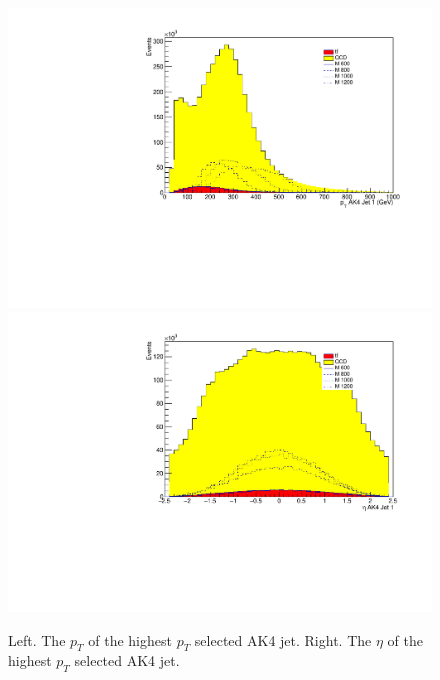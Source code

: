 \begin{figure}[thb!]
\begin{center}
\includegraphics[scale=0.34]{F5/shapeptJ1.pdf}
\includegraphics[scale=0.34]{F5/shapeetaJ1.pdf}\\
\end{center}
\caption{Left. The $p_{T}$ of the highest $p_{T}$ selected AK4 jet. Right. The $\eta$ of the highest $p_{T}$ selected AK4 jet.}
\label{fig:AK41pteta}
\end{figure} 

